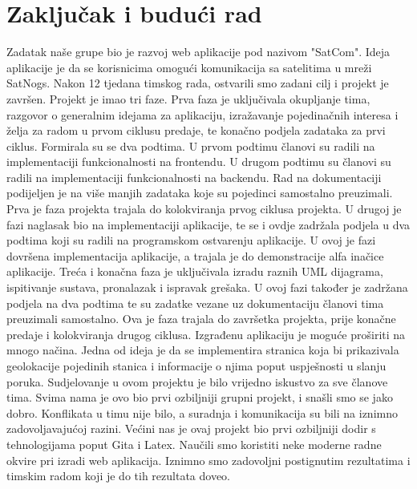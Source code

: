 \chapter{Zaključak i budući rad}
		
		 Zadatak naše grupe bio je razvoj web aplikacije pod nazivom "SatCom". Ideja aplikacije je da se korisnicima omogući komunikacija sa satelitima u mreži SatNogs. Nakon 12 tjedana timskog rada, ostvarili smo zadani cilj i projekt je završen. Projekt je imao tri faze.\newline
		 Prva faza je uključivala okupljanje tima, razgovor o generalnim idejama za aplikaciju, izražavanje pojedinačnih interesa i želja za radom u prvom ciklusu predaje, te konačno podjela zadataka za prvi ciklus. Formirala su se dva podtima. U prvom podtimu članovi su radili na implementaciji funkcionalnosti na frontendu. U drugom podtimu su članovi su radili na implementaciji funkcionalnosti na backendu. Rad na dokumentaciji podijeljen je na više manjih zadataka koje su pojedinci samostalno preuzimali. Prva je faza projekta trajala do kolokviranja prvog ciklusa projekta.\newline
		 U drugoj je fazi naglasak bio na implementaciji aplikacije, te se i ovdje zadržala podjela u dva podtima koji su radili na programskom ostvarenju aplikacije. U ovoj je fazi dovršena implementacija aplikacije, a trajala je do demonstracije alfa inačice aplikacije.\newline
		 Treća i konačna faza je uključivala izradu raznih UML dijagrama, ispitivanje sustava, pronalazak i ispravak grešaka. U ovoj fazi također je zadržana podjela na dva podtima te su zadatke vezane uz dokumentaciju članovi tima preuzimali samostalno. Ova je faza trajala do završetka projekta, prije konačne predaje i kolokviranja drugog ciklusa.\newline
		 Izgrađenu aplikaciju je moguće proširiti na mnogo načina. Jedna od ideja je da se implementira stranica koja bi prikazivala geolokacije pojedinih stanica i informacije o njima poput uspješnosti u slanju poruka.
		 Sudjelovanje u ovom projektu je bilo vrijedno iskustvo za sve članove tima. Svima nama je ovo bio prvi ozbiljniji grupni projekt, i snašli smo se jako dobro. Konflikata u timu nije bilo, a suradnja i komunikacija su bili na iznimno zadovoljavajućoj razini. Većini nas je ovaj projekt bio prvi ozbiljniji dodir s tehnologijama poput Gita i Latex. Naučili smo koristiti neke moderne radne okvire pri izradi web aplikacija. Iznimno smo zadovoljni postignutim rezultatima i timskim radom koji je do tih rezultata doveo.



		
		\eject 